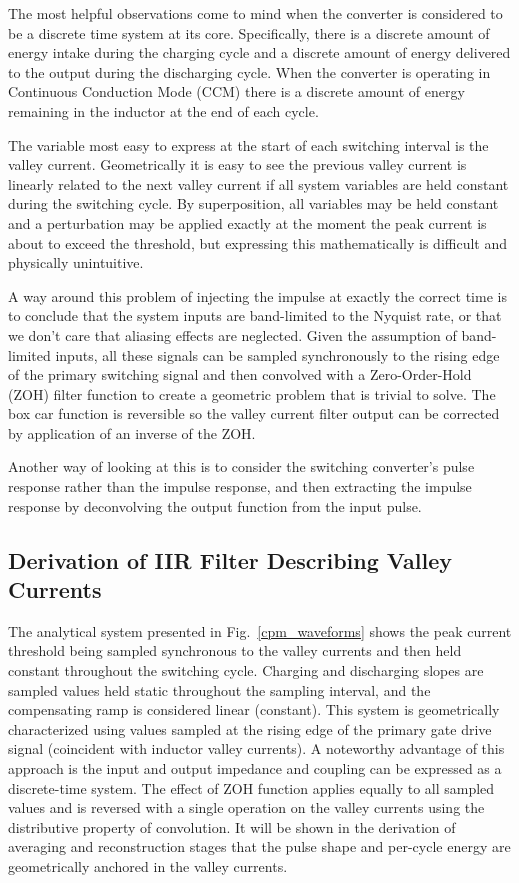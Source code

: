 \documentclass[conference]{IEEEtran}
\begin{document}
The most helpful observations come to mind when the converter is considered to be a discrete time system at its core.  Specifically, there is a discrete amount of energy intake during the charging cycle and a discrete amount of energy delivered to the output during the discharging cycle.  When the converter is operating in Continuous Conduction Mode (CCM) there is a discrete amount of energy remaining in the inductor at the end of each cycle.

The variable most easy to express at the start of each switching interval is the valley current.  Geometrically it is easy to see the previous valley current is linearly related to the next valley current if all system variables are held constant during the switching cycle.  By superposition, all variables may be held constant and a perturbation may be applied exactly at the moment the peak current is about to exceed the threshold, but expressing this mathematically is difficult and physically unintuitive.

A way around this problem of injecting the impulse at exactly the correct time is to conclude that the system inputs are band-limited to the Nyquist rate, or that we don't care that aliasing effects are neglected.  Given the assumption of band-limited inputs, all these signals can be sampled synchronously to the rising edge of the primary switching signal and then convolved with a Zero-Order-Hold (ZOH) filter function to create a geometric problem that is trivial to solve.  The box car function is reversible so the valley current filter output can be corrected by application of an inverse of the ZOH. 

Another way of looking at this is to consider the switching converter's pulse response rather than the impulse response, and then extracting the impulse response by deconvolving the output function from the input pulse.

\subsection{Derivation of IIR Filter Describing Valley Currents}
The analytical system presented in Fig.~\ref{cpm_waveforms} shows the peak current threshold being sampled synchronous to the valley currents and then held constant throughout the switching cycle.  Charging and discharging slopes are sampled values held static throughout the sampling interval, and the compensating ramp is considered linear (constant). This system is geometrically characterized using values sampled at the rising edge of the primary gate drive signal (coincident with inductor valley currents). A noteworthy advantage of this approach is the input and output impedance and coupling can be expressed as a discrete-time system.  The effect of ZOH function applies equally to all sampled values and is reversed with a single operation on the valley currents using the distributive property of convolution. It will be shown in the derivation of averaging and reconstruction stages that the pulse shape and per-cycle energy are geometrically anchored in the valley currents.
\end{document}
